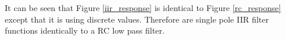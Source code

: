It can be seen that Figure \ref{iir_response} is identical to Figure \ref{rc_response} except that it is using discrete values.  Therefore are single pole IIR filter functions identically to a RC low pass filter.  







